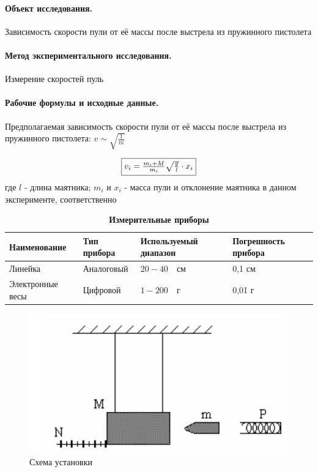 \documentclass{article}
\begin{document}
\paragraph{Объект исследования.}
Зависимость скорости пули от её массы после выстрела из пружинного пистолета

\paragraph{Метод экспериментального исследования.}
Измерение скоростей пуль

 \paragraph{Рабочие формулы и исходные данные.}\hypertarget{formuls}{}
 \begin{flushleft}
 	Предполагаемая зависимость скорости пули от её массы после выстрела из пружинного пистолета: $ v\sim\sqrt{\frac{1}{m}}$
 \end{flushleft}

\begin{equation}
	\fbox{$v_i=\frac{m_i+M}{m_i}\sqrt{\frac{g}{l}}\cdot x_i$}
\end{equation}
 	где $l$ - длина маятника; $m_i$ и $x_i$ - масса пули и отклонение маятника в данном эксперименте, соответственно

\begin{table}[h]
	\caption{\bf Измерительные приборы}
	\begin{tabular}[c]{|p{7.5em}|p{7.5em}|p{7.5em}| p{7.5em}|}
		\hline
		Наименование & Тип прибора & Используемый диапазон & Погрешность прибора\\\hline
		Линейка & Аналоговый & $20 - 40\quad\mbox{см}$ & 0,1 см\\
		\hline
		Электронные весы& Цифровой & $1 - 200\quad\mbox{г}$ & 0,01 г \\
		\hline
	\end{tabular}
\end{table}

 \begin{figure}[htb]
 	\caption{Схема установки}
\centering \includegraphics[scale=0.5]{схема}
 \end{figure}
\end{document}
